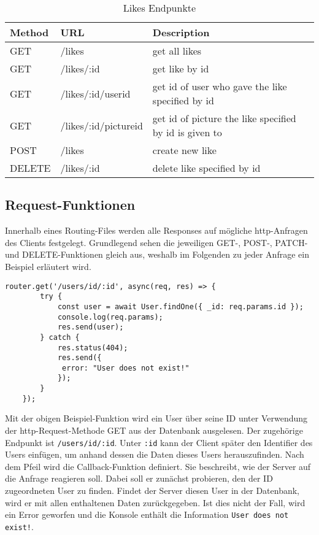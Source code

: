 \begin{table}[!htb]
    \begin{tabularx}{\textwidth}{|X|X|X|}
        \hline
        \textbf{Method} & \textbf{URL} & \textbf{Description} \\
        \hline
        \hline

    GET & /likes & get all likes\\
    \hline
    GET & /likes/:id & get like by id\\
    \hline
    GET & /likes/:id/userid & get id of user who gave the like specified by id \\
    \hline
    GET & /likes/:id/pictureid & get id of picture the like specified by id is given to\\
    \hline
    POST & /likes & create new like\\
    \hline
    DELETE & /likes/:id & delete like specified by id\\
    \hline

\end{tabularx}
\caption{Likes Endpunkte}
\label{likes endpunkte}
\end{table}

\clearpage
\subsection{Request-Funktionen}
Innerhalb eines Routing-Files werden alle Responses auf mögliche http-Anfragen des Clients festgelegt. Grundlegend sehen die jeweiligen GET-, POST-, PATCH- und DELETE-Funktionen gleich aus, weshalb im Folgenden zu jeder Anfrage ein Beispiel erläutert wird.

\begin{lstlisting}[caption=GET-Request, label=lst:getrequest, float=!htb]
    router.get('/users/id/:id', async(req, res) => {
        try {
            const user = await User.findOne({ _id: req.params.id });
            console.log(req.params);
            res.send(user);
        } catch {
            res.status(404);
            res.send({
             error: "User does not exist!"
            });
        }
    });
\end{lstlisting}

Mit der obigen Beispiel-Funktion wird ein User über seine ID unter Verwendung der http-Request-Methode GET aus der Datenbank ausgelesen. Der zugehörige Endpunkt ist \texttt{/users/id/:id}. Unter \texttt{:id} kann der Client später den Identifier des Users einfügen, um anhand dessen die Daten dieses Users herauszufinden. Nach dem Pfeil wird die Callback-Funktion definiert. Sie beschreibt, wie der Server auf die Anfrage reagieren soll. Dabei soll er zunächst probieren, den der ID zugeordneten User zu finden. Findet der Server diesen User in der Datenbank, wird er mit allen enthaltenen Daten zurückgegeben. Ist dies nicht der Fall, wird ein Error geworfen und die Konsole enthält die Information \texttt{User does not exist!}.

